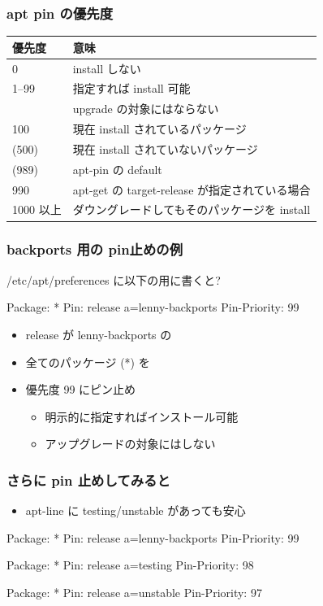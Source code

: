 \documentclass[cjk,dvipdfmx,12pt,%
hyperref={bookmarks=true,bookmarksnumbered=true,bookmarksopen=false,%
colorlinks=false,%
pdftitle={野良ビルドから始めるパッケージ作成},%
pdfauthor={佐々木洋平},%
pdfsubject={第37回関西Debian勉強会 at OSC 2010 Kansai$@$kyoto},%
}]{beamer}
\begin{document}
\begin{frame}[fragile]
\frametitle{apt pin の優先度}

\begin{tabular}{ll}
優先度 & 意味 \\
\hline
0 & install しない \\
1--99 & 指定すれば install 可能 \\
 & upgrade の対象にはならない \\
100 & 現在 install されているパッケージ \\
(500) & 現在 install されていないパッケージ \\
(989) & apt-pin の default \\
990 & apt-get の target-release が指定されている場合 \\
1000 以上 & ダウングレードしてもそのパッケージを install \\
\end{tabular}
\end{frame}

\begin{frame}[fragile]
\frametitle{backports 用の pin止めの例}


/etc/apt/preferences に以下の用に書くと?


\begin{commandline}
Package: *
Pin: release a=lenny-backports
Pin-Priority: 99
\end{commandline}

\begin{itemize}
\item release が lenny-backports の
\item 全てのパッケージ (*) を
\item 優先度 99 にピン止め

\begin{itemize}
\item 明示的に指定すればインストール可能
\item アップグレードの対象にはしない
\end{itemize}
\end{itemize}


\end{frame}


\begin{frame}[fragile]
\frametitle{さらに pin 止めしてみると}

\begin{itemize}
\item apt-line に testing/unstable があっても安心
\end{itemize}

\begin{commandline}
Package: *
Pin: release a=lenny-backports
Pin-Priority: 99

Package: *
Pin: release a=testing
Pin-Priority: 98

Package: *
Pin: release a=unstable
Pin-Priority: 97
\end{commandline}


\end{frame}
\end{document}
